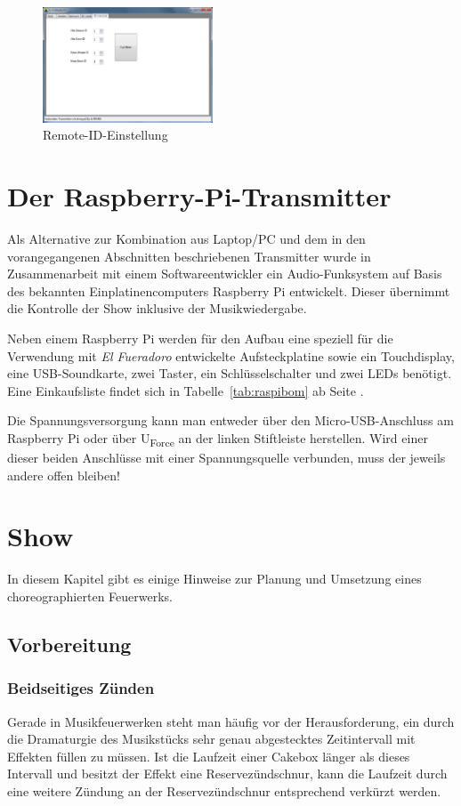 \documentclass[paper=a4, parskip, numbers=noenddot, toc=listof, headsepline]{scrbook}
\newcommand{\anlage}{\emph{El Fueradoro}}
\begin{document}
				\begin{figure}[!t]
					\centering
					\includegraphics[width=0.45\textwidth]{bilder/gui-remote}
					\caption{Remote-ID-Einstellung}
					\label{fig:gui-remote}
				\end{figure}

		\chapter{Der Raspberry-Pi-Transmitter}

			Als Alternative zur Kombination aus Laptop/PC und dem in den vorangegangenen Abschnitten beschriebenen Transmitter wurde in Zusammenarbeit mit einem Softwareentwickler ein Audio-Funksystem auf Basis des bekannten Einplatinencomputers Raspberry Pi entwickelt. Dieser übernimmt die Kontrolle der Show inklusive der Musikwiedergabe.

			Neben einem Raspberry Pi werden für den Aufbau eine speziell für die Verwendung mit {\anlage} entwickelte Aufsteckplatine sowie ein Touchdisplay, eine USB-Soundkarte, zwei Taster, ein Schlüsselschalter und zwei LEDs benötigt. Eine Einkaufsliste findet sich in Tabelle~\ref{tab:raspibom} ab Seite \pageref{tab:raspibom}.

			Die Spannungsversorgung kann man entweder über den Micro-USB-Anschluss am Raspberry Pi oder über U\textsubscript{Force} an der linken Stiftleiste herstellen. Wird einer dieser beiden Anschlüsse mit einer Spannungsquelle verbunden, muss der jeweils andere offen bleiben!

		\chapter{Show}
			In diesem Kapitel gibt es einige Hinweise zur Planung und Umsetzung eines choreographierten Feuerwerks.
			\section{Vorbereitung}

				\subsection{Beidseitiges Zünden}
					Gerade in Musikfeuerwerken steht man häufig vor der Herausforderung, ein durch die Dramaturgie des Musikstücks sehr genau abgestecktes Zeitintervall mit Effekten füllen zu müssen. Ist die Laufzeit einer Cakebox länger als dieses Intervall und besitzt der Effekt eine Reservezündschnur, kann die Laufzeit durch eine weitere Zündung an der Reservezündschnur entsprechend verkürzt werden.
\end{document}
